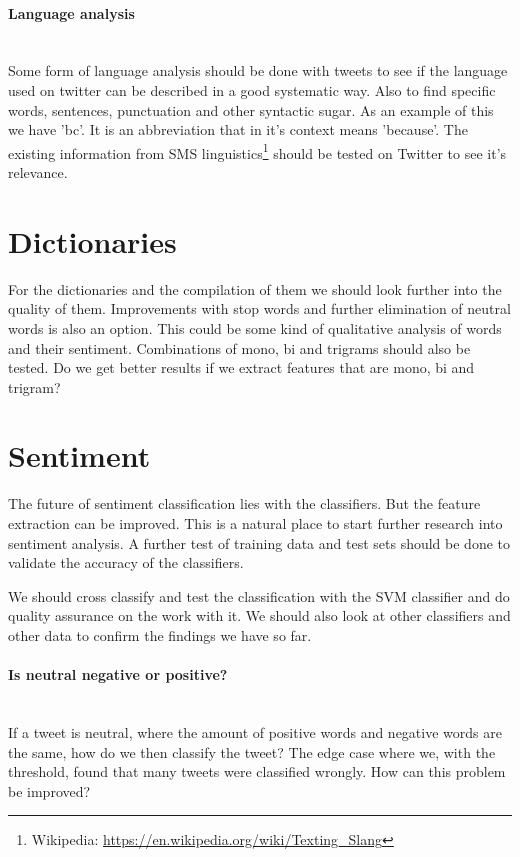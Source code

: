 \paragraph{Language analysis}
\hspace{0pt}\\
Some form of language analysis should be done with tweets to see if the
language used on twitter can be described in a good systematic way. Also to
find specific words, sentences, punctuation and other syntactic sugar. 
As an example of this we have 'bc'. It is an abbreviation that in it's
context means 'because'. The existing information from SMS
linguistics\footnote{Wikipedia:
\url{https://en.wikipedia.org/wiki/Texting_Slang}} should be
tested on Twitter to see it's relevance. 
%

\section{Dictionaries}\label{future_work:dictionaries}
For the dictionaries and the compilation of them we should look further into
the quality of them. Improvements with stop words and further elimination of
neutral words is also an option. This could be some kind of qualitative
analysis of words and their sentiment. Combinations of mono, bi and trigrams
should also be tested. Do we get better results if we extract features that are
mono, bi and trigram? 
%

\section{Sentiment}\label{future_work:sentiment}
The future of sentiment classification lies with the classifiers. But the
feature extraction can be improved. This is a natural place to start further
research into sentiment analysis. A further test of training data and test sets
should be done to validate the accuracy of the classifiers.   

We should cross classify and test the classification with the SVM classifier
and do quality assurance on the work with it. We should also look at other
classifiers and other data to confirm the findings we have so far.
 
\paragraph{Is neutral negative or positive?}
\hspace{0pt}\\
If a tweet is neutral, where the amount of positive words and
negative words are the same, how do we then classify the tweet? The edge case
where we, with the threshold, found that many tweets were classified wrongly.
How can this problem be improved?

